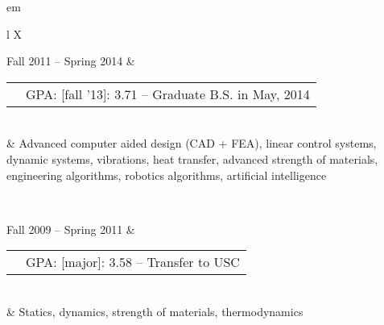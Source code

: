 


	
{ em
\begin{tabu}{ L{\tabularIndent} X } \hhline{==}
	\hhline{==}
	
	Fall 2011 -- Spring 2014 & 
	\begin{tabular}{ l | l }
		\mysubsection{University of Southern California} & GPA: [fall '13]: 3.71 -- Graduate B.S. in May, 2014 \\ \cline{1-1}
	\end{tabular}
	\\
	&
	Advanced computer aided design (CAD + FEA), linear control systems, dynamic systems, vibrations, heat transfer, advanced strength of materials, engineering algorithms, robotics algorithms, artificial intelligence

\\ \hhline{==}

	Fall 2009 -- Spring 2011 & 
	\begin{tabular}{ l | l }
		\mysubsection{University of Massachusetts, Amherst} & GPA: [major]: 3.58 -- Transfer to USC \\ \cline{1-1}
	\end{tabular}
	\\
	& Statics, dynamics, strength of materials, thermodynamics
\end{tabu}}